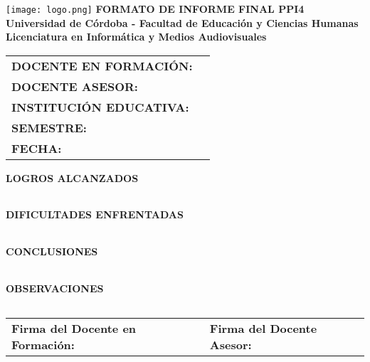 \documentclass[a4paper,12pt]{article}
\begin{document}
\begin{center}
    \vspace*{1cm}
    \texttt{[image: logo.png]} %
    \vspace{0.5cm}
    \textbf{\Large FORMATO DE INFORME FINAL PPI4} \\
    \vspace{0.5cm}
    \textbf{Universidad de Córdoba - Facultad de Educación y Ciencias Humanas} \\
    \textbf{Licenciatura en Informática y Medios Audiovisuales}
\end{center}

\vspace{0.5cm}
\begin{tabularx}{\textwidth}{@{}p{5cm}X@{}}
    \toprule
    \textbf{DOCENTE EN FORMACIÓN:} & \hrulefill \\
    \textbf{DOCENTE ASESOR:} & \hrulefill \\
    \textbf{INSTITUCIÓN EDUCATIVA:} & \hrulefill \\
    \textbf{SEMESTRE:} & \hrulefill \\
    \textbf{FECHA:} & \hrulefill \\
    \bottomrule
\end{tabularx}

\vspace{0.5cm}
\noindent
\textbf{LOGROS ALCANZADOS}
\begin{tabularx}{\textwidth}{|X|}
    \hline
    \vspace{3cm} \\ \hline
\end{tabularx}

\vspace{0.5cm}
\noindent
\textbf{DIFICULTADES ENFRENTADAS}
\begin{tabularx}{\textwidth}{|X|}
    \hline
    \vspace{3cm} \\ \hline
\end{tabularx}

\vspace{0.5cm}
\noindent
\textbf{CONCLUSIONES}
\begin{tabularx}{\textwidth}{|X|}
    \hline
    \vspace{3cm} \\ \hline
\end{tabularx}

\vspace{0.5cm}
\noindent
\textbf{OBSERVACIONES}
\begin{tabularx}{\textwidth}{|X|}
    \hline
    \vspace{3cm} \\ \hline
\end{tabularx}

\vspace{0.5cm}
\begin{center}
    \begin{tabular}{p{7cm}p{7cm}}
        \hline
        \textbf{Firma del Docente en Formación:} \hrulefill & \textbf{Firma del Docente Asesor:} \hrulefill \\
    \end{tabular}
\end{center}
\end{document}
